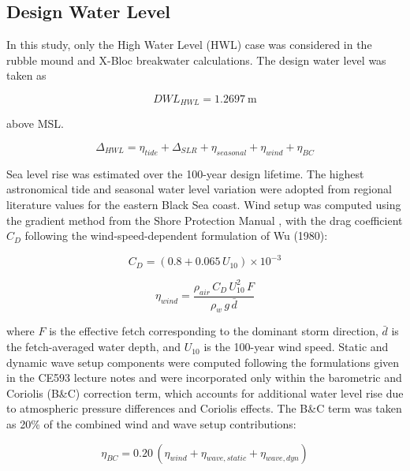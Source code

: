 \documentclass[a4paper, 11pt]{article}
\begin{document}
\subsection{Design Water Level}
\label{sec:dwl}

\hspace*{0.5cm} In this study, only the High Water Level (HWL) case was considered in the rubble mound and X-Bloc breakwater calculations. The design water level was taken as

\begin{equation}
    DWL_{HWL}=1.2697~\mathrm{m}
\end{equation}

above MSL.

\begin{equation}
    \Delta_{HWL} = \eta_{tide} + \Delta_{SLR} + \eta_{seasonal} 
    + \eta_{wind} + \eta_{BC}
\end{equation}

Sea level rise was estimated over the 100-year design lifetime. The highest astronomical tide and seasonal water level variation were adopted from regional literature values for the eastern Black Sea coast. Wind setup was computed using the 
gradient method from the Shore Protection Manual \cite{SPM1984}, 
with the drag coefficient $C_D$ following the wind-speed-dependent 
formulation of Wu (1980):

\begin{equation}
    C_D = (0.8 + 0.065\,U_{10}) \times 10^{-3}
\end{equation}

\begin{equation}
    \eta_{wind} = \frac{\rho_{air}\,C_D\,U_{10}^2\,F}
    {\rho_w\,g\,\bar{d}}
\end{equation}

where $F$ is the effective fetch corresponding to the dominant storm 
direction, $\bar{d}$ is the fetch-averaged water depth, and $U_{10}$ 
is the 100-year wind speed. Static and dynamic wave setup components were computed following the formulations given in the CE593 lecture notes \cite{CE593} and were incorporated only within the barometric and Coriolis 
(B\&C) correction term, which accounts for additional water level 
rise due to atmospheric pressure differences and Coriolis effects. 
The B\&C term was taken as 20\% of the combined wind and wave 
setup contributions:

\begin{equation}
    \eta_{BC} = 0.20\,(\eta_{wind} + \eta_{wave,static} + \eta_{wave,dyn})
\end{equation}
\end{document}
